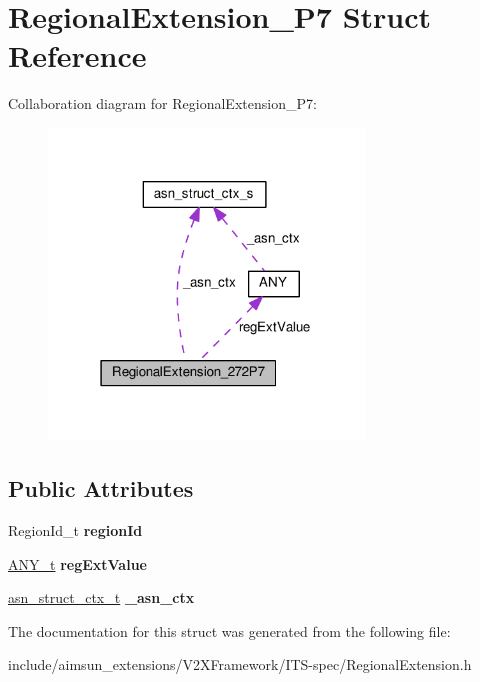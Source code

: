 \hypertarget{structRegionalExtension__272P7}{}\section{Regional\+Extension\+\_\+P7 Struct Reference}
\label{structRegionalExtension__272P7}


Collaboration diagram for Regional\+Extension\+\_\+P7\+:\nopagebreak
\begin{figure}[H]
\begin{center}
\leavevmode
\includegraphics[width=238pt]{structRegionalExtension__272P7__coll__graph}
\end{center}
\end{figure}
\subsection*{Public Attributes}
\begin{DoxyCompactItemize}
\item 
Region\+Id\+\_\+t {\bfseries region\+Id}\hypertarget{structRegionalExtension__272P7_a144862ee5d72ff4eaa404d4e08b82bb4}{}\label{structRegionalExtension__272P7_a144862ee5d72ff4eaa404d4e08b82bb4}

\item 
\hyperlink{structANY}{A\+N\+Y\+\_\+t} {\bfseries reg\+Ext\+Value}\hypertarget{structRegionalExtension__272P7_abb2dbe2679e667c4db2354756604f5c6}{}\label{structRegionalExtension__272P7_abb2dbe2679e667c4db2354756604f5c6}

\item 
\hyperlink{structasn__struct__ctx__s}{asn\+\_\+struct\+\_\+ctx\+\_\+t} {\bfseries \+\_\+asn\+\_\+ctx}\hypertarget{structRegionalExtension__272P7_a43aa20f8b27f4f9333f6fbed0f8bc433}{}\label{structRegionalExtension__272P7_a43aa20f8b27f4f9333f6fbed0f8bc433}

\end{DoxyCompactItemize}


The documentation for this struct was generated from the following file\+:\begin{DoxyCompactItemize}
\item 
include/aimsun\+\_\+extensions/\+V2\+X\+Framework/\+I\+T\+S-\/spec/Regional\+Extension.\+h\end{DoxyCompactItemize}

